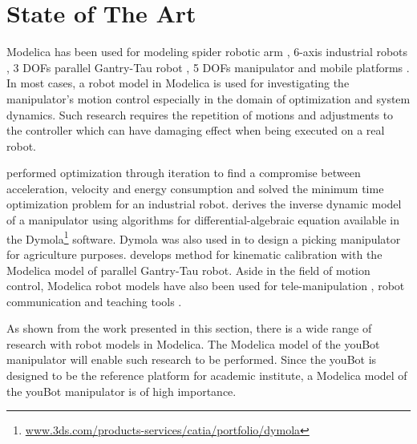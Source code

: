 \section{State of The Art}
\label{sec:state_of_the_art}

Modelica has been used for modeling spider robotic arm \cite{Ferreti2003}, 6-axis industrial robots \cite{Thuemmel2001, Kazi2002, Hast2009}, 3 DOFs parallel Gantry-Tau robot \cite{Dressler2009}, 5 DOFs manipulator \cite{Chen2009} and mobile platforms \cite{Akesson2009, Pohlmann2012}.
In most cases, a robot model in Modelica is used for investigating the  manipulator's motion control especially in the domain of optimization and system dynamics.
Such research requires the repetition of motions and adjustments to the controller which can have damaging effect when being executed on a real robot.

\cite{Kazi2002} performed optimization through iteration to find a compromise between acceleration, velocity and energy consumption and \cite{Hast2009} solved the minimum time optimization problem for an industrial robot.
\cite{Thuemmel2001} derives the inverse dynamic model of a manipulator using algorithms for differential-algebraic equation available in the Dymola\footnote{\href{http://www.3ds.com/products-services/catia/portfolio/dymola}{www.3ds.com/products-services/catia/portfolio/dymola}} software. 
Dymola was also used in \cite{Chen2009} to design a picking manipulator for agriculture purposes.
\cite{Dressler2009} develops method for kinematic calibration with the Modelica model of parallel Gantry-Tau robot.
Aside in the field of motion control, Modelica robot models have also been used for tele-manipulation \cite{Ferreti2003}, robot communication \cite{Pohlmann2012} and teaching tools \cite{Akesson2009}.

As shown from the work presented in this section, there is a wide range of research with robot models in Modelica.
The Modelica model of the youBot manipulator will enable such research to be performed.
Since the youBot is designed to be the reference platform for academic institute, a Modelica model of the youBot manipulator is of high importance.

